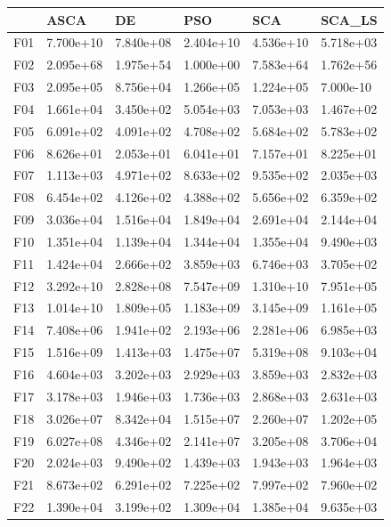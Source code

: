 \begin{tabular}{llllll}
\toprule
{} &       ASCA &         DE &        PSO &        SCA &     SCA\_LS \\
\midrule
F01  &  7.700e+10 &  7.840e+08 &  2.404e+10 &  4.536e+10 &  5.718e+03 \\
F02  &  2.095e+68 &  1.975e+54 &  1.000e+00 &  7.583e+64 &  1.762e+56 \\
F03  &  2.095e+05 &  8.756e+04 &  1.266e+05 &  1.224e+05 &  7.000e-10 \\
F04  &  1.661e+04 &  3.450e+02 &  5.054e+03 &  7.053e+03 &  1.467e+02 \\
F05  &  6.091e+02 &  4.091e+02 &  4.708e+02 &  5.684e+02 &  5.783e+02 \\
F06  &  8.626e+01 &  2.053e+01 &  6.041e+01 &  7.157e+01 &  8.225e+01 \\
F07  &  1.113e+03 &  4.971e+02 &  8.633e+02 &  9.535e+02 &  2.035e+03 \\
F08  &  6.454e+02 &  4.126e+02 &  4.388e+02 &  5.656e+02 &  6.359e+02 \\
F09  &  3.036e+04 &  1.516e+04 &  1.849e+04 &  2.691e+04 &  2.144e+04 \\
F10  &  1.351e+04 &  1.139e+04 &  1.344e+04 &  1.355e+04 &  9.490e+03 \\
F11  &  1.424e+04 &  2.666e+02 &  3.859e+03 &  6.746e+03 &  3.705e+02 \\
F12  &  3.292e+10 &  2.828e+08 &  7.547e+09 &  1.310e+10 &  7.951e+05 \\
F13  &  1.014e+10 &  1.809e+05 &  1.183e+09 &  3.145e+09 &  1.161e+05 \\
F14  &  7.408e+06 &  1.941e+02 &  2.193e+06 &  2.281e+06 &  6.985e+03 \\
F15  &  1.516e+09 &  1.413e+03 &  1.475e+07 &  5.319e+08 &  9.103e+04 \\
F16  &  4.604e+03 &  3.202e+03 &  2.929e+03 &  3.859e+03 &  2.832e+03 \\
F17  &  3.178e+03 &  1.946e+03 &  1.736e+03 &  2.868e+03 &  2.631e+03 \\
F18  &  3.026e+07 &  8.342e+04 &  1.515e+07 &  2.260e+07 &  1.202e+05 \\
F19  &  6.027e+08 &  4.346e+02 &  2.141e+07 &  3.205e+08 &  3.706e+04 \\
F20  &  2.024e+03 &  9.490e+02 &  1.439e+03 &  1.943e+03 &  1.964e+03 \\
F21  &  8.673e+02 &  6.291e+02 &  7.225e+02 &  7.997e+02 &  7.960e+02 \\
F22  &  1.390e+04 &  3.199e+02 &  1.309e+04 &  1.385e+04 &  9.635e+03 \\

\end{tabular}
